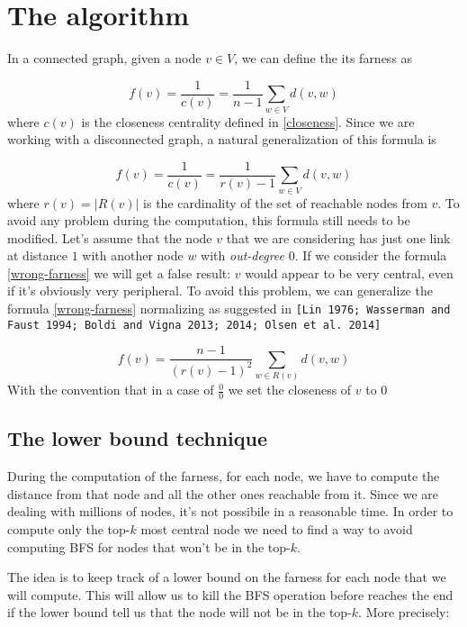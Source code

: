 \section{The algorithm}

In a connected graph, given a node $v \in V$, we can define the its farness as

\begin{equation}
    f(v) = \frac{1}{c(v)} = \frac{1}{n-1} \displaystyle \sum_{w \in V} d(v,w)
\end{equation}
where $c(v)$ is the closeness centrality defined in \eqref{closeness}. Since we are working with a disconnected graph, a natural generalization of this formula is

\begin{equation}\label{wrong-farness}
    f(v) = \frac{1}{c(v)} = \frac{1}{r(v)-1} \displaystyle \sum_{w \in V} d(v,w)
\end{equation}
where $r(v) = |R(v)|$ is the cardinality of the set of reachable nodes from $v$. To avoid any problem during the computation, this formula still needs to be modified. Let's assume that the node $v$ that we are considering has just one link at distance $1$ with another node $w$ with \emph{out-degree} 0. If we consider the formula \eqref{wrong-farness} we will get a false result: $v$ would appear to be very central, even if it's obviously very peripheral. To avoid this problem, we can generalize the formula \eqref{wrong-farness} normalizing as suggested in \texttt{[Lin 1976; Wasserman and Faust 1994; Boldi and Vigna 2013; 2014; Olsen et al. 2014]}

\begin{equation}\label{farness}
    f(v) = \frac{n-1}{(r(v)-1)^2} \sum_{w \in R(v)} d(v,w)
\end{equation}
With the convention that in a case of $\frac{0}{0}$ we set the closeness of $v$ to 0

\subsection{The lower bound technique}
During the computation of the farness, for each node, we have to compute the distance from that node and all the other ones reachable from it. Since we are dealing with millions of nodes, it's not possibile in a reasonable time. In order to compute only the top-$k$ most central node we need to find a way to avoid computing BFS for nodes that won't be in the top-$k$. \s

\noindent The idea is to keep track of a lower bound on the farness for each node that we will compute. This will allow us to kill the BFS operation before reaches the end if the lower bound tell us that the node will not be in the top-$k$. More precisely:


